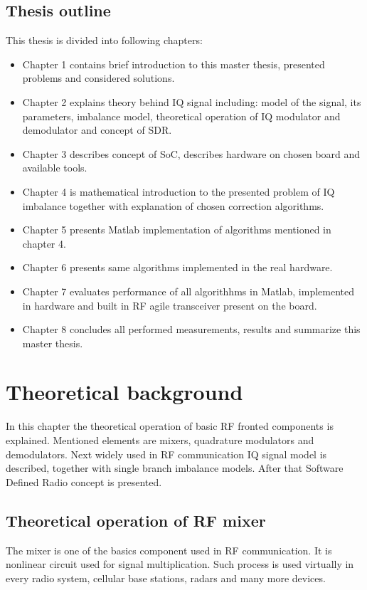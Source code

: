 \documentclass[en,printmode]{mgr}
\begin{document}
	\section{Thesis outline}
		This thesis is divided into following chapters:
		\begin{itemize}
			\item Chapter 1 contains brief introduction to this master thesis, presented problems and
				  considered solutions.
			\item Chapter 2 explains theory behind IQ signal including: model of the signal, its parameters,
			      imbalance model, theoretical operation of IQ modulator and demodulator and concept of SDR.
			\item Chapter 3 describes concept of SoC, describes hardware on chosen board and available tools.
			\item Chapter 4 is mathematical introduction to the presented problem of IQ imbalance together
			      with explanation of chosen correction algorithms.
			\item Chapter 5 presents Matlab implementation of algorithms mentioned in chapter 4.
			\item Chapter 6 presents same algorithms implemented in the real hardware.
			\item Chapter 7 evaluates performance of all algorithhms in Matlab, implemented in hardware
			      and built in RF agile transceiver present on the board.
			\item Chapter 8 concludes all performed measurements, results and summarize this master thesis.
		\end{itemize}			
\chapter{Theoretical background}
	In this chapter the theoretical operation of basic RF fronted components is explained. Mentioned elements
	are mixers, quadrature modulators and demodulators. Next widely used in RF communication IQ signal model
	is described, together with single branch imbalance models. After that Software Defined Radio concept is
	presented.

	\section{Theoretical operation of RF mixer}
		The mixer is one of the basics component used in RF communication. It is nonlinear circuit used for
		signal multiplication. Such process is used virtually in every radio system, cellular base stations,
		radars and many more devices. 
		\\
		
\end{document}
